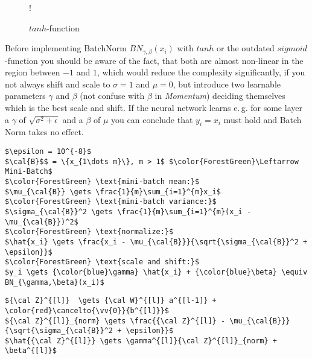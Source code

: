 \documentclass[dvipsnames,twocolumn]{scrartcl}
\begin{document}
	\begin{figure}
		\caption{$tanh$-function}
		\resizebox {\columnwidth} {!} {}
	\end{figure}
	
	Before implementing BatchNorm $BN_{\gamma,\beta}(x_i)$ with $tanh$ or the outdated $sigmoid$-function you should be aware of the fact, that both are almost non-linear in the region between $-1$ and $1$, which would reduce the complexity significantly, if you not always shift and scale to $\sigma = 1$ and $\mu = 0$, but introduce two learnable parameters $\gamma$ and $\beta$ (not confuse with $\beta$ in \emph{Momentum}) deciding themselves which is the best scale and shift. If the neural network learns e.\,g. for some layer a $\gamma$ of  $\sqrt{\sigma^2 + \epsilon}$ and a $\beta$ of $\mu$ you can conclude that $y_i = x_i$ must hold and Batch Norm takes no effect.
	
	\begin{lstlisting}[frame=single,basicstyle=\linespread{1.5}\ttfamily,caption={\texttt{Batch-Norm} Algorithm}]
$\epsilon = 10^{-8}$
$\cal{B}$$ = \{x_{1\dots m}\}, m > 1$ $\color{ForestGreen}\Leftarrow Mini-Batch$
$\color{ForestGreen} \text{mini-batch mean:}$
$\mu_{\cal{B}} \gets \frac{1}{m}\sum_{i=1}^{m}x_i$
$\color{ForestGreen} \text{mini-batch variance:}$
$\sigma_{\cal{B}}^2 \gets \frac{1}{m}\sum_{i=1}^{m}(x_i - \mu_{\cal{B}})^2$
$\color{ForestGreen} \text{normalize:}$
$\hat{x_i} \gets \frac{x_i - \mu_{\cal{B}}}{\sqrt{\sigma_{\cal{B}}^2 + \epsilon}}$
$\color{ForestGreen} \text{scale and shift:}$
$y_i \gets {\color{blue}\gamma} \hat{x_i} + {\color{blue}\beta} \equiv BN_{\gamma,\beta}(x_i)$
	\end{lstlisting}
	
	\begin{lstlisting}[frame=single,basicstyle=\linespread{1.5}\ttfamily,caption={\texttt{Batch-Norm} Algorithm in a Neural-Net Layer}]
${\cal Z}^{[l]}  \gets {\cal W}^{[l]} a^{[l-1]} + \color{red}\cancelto{\vv{0}}{b^{[l]}}$
${\cal Z}^{[l]}_{norm} \gets \frac{{\cal Z}^{[l]} - \mu_{\cal{B}}}{\sqrt{\sigma_{\cal{B}}^2 + \epsilon}}$
$\hat{{\cal Z}^{[l]}} \gets \gamma^{[l]}{\cal Z}^{[l]}_{norm} + \beta^{[l]}$
	\end{lstlisting}
	
\end{document}
